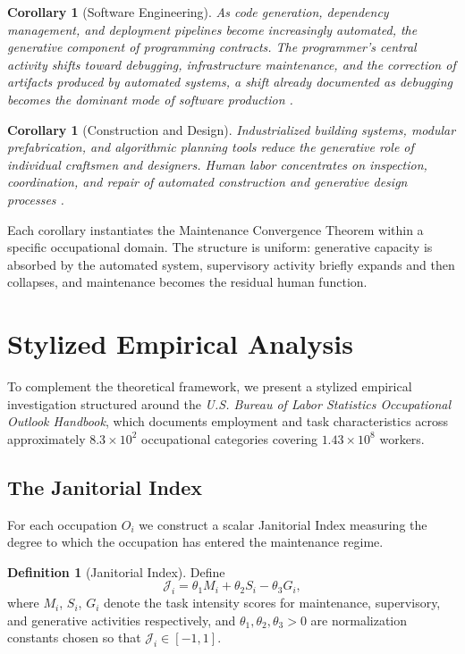 \documentclass[12pt,a4paper]{article}
\theoremstyle{plain}
\newtheorem{corollary}[theorem]{Corollary}
\theoremstyle{definition}
\newtheorem{definition}[theorem]{Definition}
\theoremstyle{remark}
\begin{document}
\begin{corollary}[Software Engineering]
As code generation, dependency management, and deployment pipelines become
increasingly automated, the generative component of programming contracts.
The programmer's central activity shifts toward debugging, infrastructure
maintenance, and the correction of artifacts produced by automated systems, a
shift already documented as debugging becomes the dominant mode of software
production \cite{lientz1980,gray2019}.
\end{corollary}

\begin{corollary}[Construction and Design]
Industrialized building systems, modular prefabrication, and algorithmic
planning tools reduce the generative role of individual craftsmen and
designers.  Human labor concentrates on inspection, coordination, and repair
of automated construction and generative design processes \cite{bock2015}.
\end{corollary}

Each corollary instantiates the Maintenance Convergence Theorem within a
specific occupational domain.  The structure is uniform: generative capacity
is absorbed by the automated system, supervisory activity briefly expands and
then collapses, and maintenance becomes the residual human function.

\section{Stylized Empirical Analysis}
\label{sec:empirical}

To complement the theoretical framework, we present a stylized empirical
investigation structured around the \textit{U.S. Bureau of Labor Statistics
Occupational Outlook Handbook}, which documents employment and task
characteristics across approximately $8.3 \times 10^2$ occupational
categories covering $1.43 \times 10^8$ workers.

\subsection{The Janitorial Index}

For each occupation $O_i$ we construct a scalar Janitorial Index measuring
the degree to which the occupation has entered the maintenance regime.

\begin{definition}[Janitorial Index]
Define
\[
\mathcal{J}_i = \theta_1 M_i + \theta_2 S_i - \theta_3 G_i,
\]
where $M_i$, $S_i$, $G_i$ denote the task intensity scores for maintenance,
supervisory, and generative activities respectively, and
$\theta_1,\theta_2,\theta_3 > 0$ are normalization constants chosen so that
$\mathcal{J}_i \in [-1, 1]$.
\end{definition}
\end{document}

